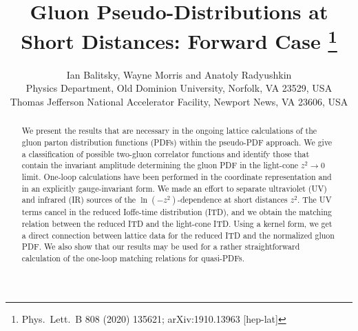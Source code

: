 \documentclass[11pt]{article}
\title{Gluon Pseudo-Distributions at Short Distances: Forward Case%
\thanks{Phys.\ Lett.\ B 808 (2020) 135621; arXiv:1910.13963 [hep-lat]}}
\author{Ian Balitsky, Wayne Morris and Anatoly Radyushkin\\[8pt]
\normalsize Physics Department, Old Dominion University, Norfolk, VA 23529, USA\\[3pt]
\normalsize Thomas Jefferson National Accelerator Facility, Newport News, VA 23606, USA}
\date{}
\begin{document}
\maketitle

\begin{abstract}
We present the results that are necessary in
the ongoing lattice calculations of the gluon parton distribution functions
(PDFs) within the pseudo-PDF approach.
We give a classification of possible two-gluon correlator functions and
identify those that contain the invariant amplitude
determining the gluon PDF in the light-cone $z^2 \to 0$ limit.
One-loop calculations have been performed
in the coordinate representation and
in an explicitly
gauge-invariant form.
We made an effort to
separate ultraviolet (UV) and infrared (IR) sources of the \mbox{$\ln (-z^2)$-dependence}
at short distances $z^2$.
The UV terms
cancel in the reduced Ioffe-time distribution (ITD),
and we obtain
the matching relation
between the reduced ITD and the light-cone ITD.
Using a kernel form, we get
a direct connection between lattice data for the reduced ITD
and the normalized
gluon PDF. We also show that our results
may be used for a rather straightforward calculation
of the
one-loop matching relations for quasi-PDFs.
\end{abstract}










\end{document}
